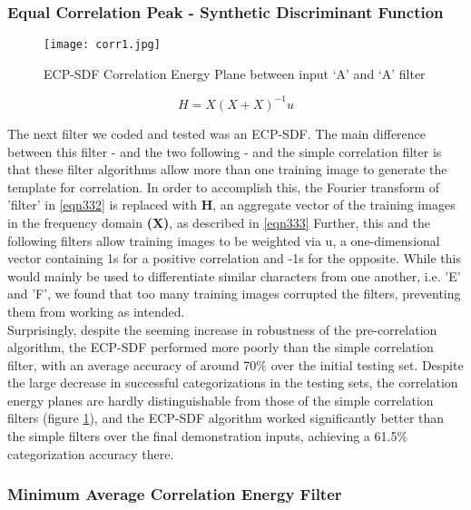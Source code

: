 \subsubsection{Equal Correlation Peak - Synthetic Discriminant Function}

\begin{figure}[h]
		\texttt{[image: corr1.jpg]}\\
		\caption{ ECP-SDF Correlation Energy Plane between input ‘A’ and ‘A’ filter}
		\label{fig:corr1}
\end{figure}

\begin{equation}
\label{eqn333}
H = X(X+X)^{-1} u
\end{equation}

The next filter we coded and tested was an ECP-SDF. The main difference between
this filter - and the two following - and the simple correlation filter is that
these filter algorithms allow more than one training image 
to generate the template for correlation. In order to accomplish this, 
the Fourier transform of 'filter' in \eqref{eqn332} is replaced with \textbf{H}, an 
aggregate vector of the training images in the frequency domain \textbf{(X)}, as 
described in \eqref{eqn333} Further, this and the following filters allow 
training images to be weighted via u, a one-dimensional vector containing 
1s for a positive correlation and -1s for the opposite. While this would 
mainly be used to differentiate similar characters from one another, i.e. 
'E' and 'F', we found that too many training images corrupted the filters, 
preventing them from working as intended.\\

Surprisingly, despite the seeming increase in robustness of the 
pre-correlation algorithm, the ECP-SDF performed more poorly than 
the simple correlation filter, with an average accuracy of around 
70\% over the initial testing set. Despite the large decrease in successful 
categorizations in the testing sets, the correlation energy planes are 
hardly distinguishable from those of the simple correlation filters (figure \ref{fig:corr1}), 
and the ECP-SDF algorithm worked significantly better than the simple filters over
the final demonstration inputs, achieving a 61.5\% categorization accuracy there.
\subsubsection{Minimum Average Correlation Energy Filter}

